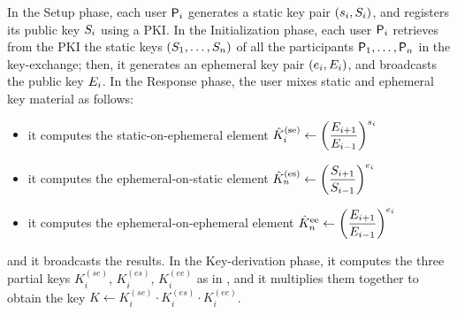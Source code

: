 In the Setup phase, each user $\User[i]$ generates a static key pair $(\ssk_i,\spk_i)$, and registers its public key $\spk_i$ using a PKI.
In the Initialization phase, each user $\User[i]$ retrieves from the PKI the static keys $(\spk_1,\dots,\spk_n)$ of all the participants $\User[1],\dots,\User[n]$  in the key-exchange; then, it generates an ephemeral key pair $(\esk_i,\epk_i)$, and broadcasts the public key $\epk_i$. 
In the Response phase, the user mixes static and ephemeral key material as follows:
\begin{itemize}
	\item it computes the static-on-ephemeral element $\hat{K}_i^\text{(se)} \gets \left( \dfrac{\epk_{i+1}}{\epk_{i-1}}\right)^{\ssk_i}$
	\item it computes the ephemeral-on-static element $\hat{K}_n^\text{(es)} \gets \left( \dfrac{\spk_{i+1}}{\spk_{i-1}}\right)^{\esk_i}$
	\item it computes the ephemeral-on-ephemeral element $\hat{K}_n^\text{ee} \gets \left( \dfrac{\epk_{i+1}}{\epk_{i-1}}\right)^{\esk_i}$ 
\end{itemize}
and it broadcasts the results.
In the Key-derivation phase, it computes the three partial keys $K_i^{(se)}$, $K_i^{(es)}$, $K_i^{(ee)}$ as in , and it multiplies them together to obtain the key $K \gets K_i^{(se)} \cdot K_i^{(es)} \cdot K_i^{(ee)}$.

